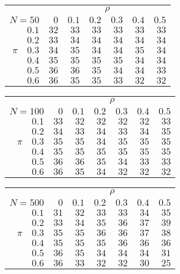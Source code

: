 \begin{tabular}{r|rrrrrr}
\hline\hline
 &\multicolumn{6}{c}{$\rho$} \\ 
 $N = 50$ & $0$ & $0.1$ & $0.2$ & $0.3$ & $0.4$ & $0.5$ \\ 
 \hline$0.1$ & $32$ & $33$ & $33$ & $33$ & $33$ & $33$\\ 
$0.2$ & $33$ & $34$ & $34$ & $34$ & $34$ & $34$\\ 
$\pi\quad$$0.3$ & $34$ & $35$ & $34$ & $34$ & $35$ & $34$\\ 
$0.4$ & $35$ & $35$ & $35$ & $35$ & $34$ & $34$\\ 
$0.5$ & $36$ & $36$ & $35$ & $34$ & $34$ & $33$\\ 
$0.6$ & $36$ & $35$ & $35$ & $33$ & $32$ & $32$\\ 
 \hline 
 \end{tabular}
 
 \vspace{2em} 
 
\begin{tabular}{r|rrrrrr}
\hline\hline
 &\multicolumn{6}{c}{$\rho$} \\ 
 $N = 100$ & $0$ & $0.1$ & $0.2$ & $0.3$ & $0.4$ & $0.5$ \\ 
 \hline$0.1$ & $33$ & $32$ & $32$ & $32$ & $32$ & $33$\\ 
$0.2$ & $34$ & $33$ & $34$ & $33$ & $34$ & $35$\\ 
$\pi\quad$$0.3$ & $35$ & $35$ & $34$ & $35$ & $35$ & $35$\\ 
$0.4$ & $35$ & $35$ & $35$ & $35$ & $35$ & $35$\\ 
$0.5$ & $36$ & $36$ & $35$ & $34$ & $33$ & $33$\\ 
$0.6$ & $36$ & $35$ & $34$ & $32$ & $32$ & $32$\\ 
 \hline 
 \end{tabular}
 
 \vspace{2em} 
 
\begin{tabular}{r|rrrrrr}
\hline\hline
 &\multicolumn{6}{c}{$\rho$} \\ 
 $N = 500$ & $0$ & $0.1$ & $0.2$ & $0.3$ & $0.4$ & $0.5$ \\ 
 \hline$0.1$ & $31$ & $32$ & $33$ & $33$ & $34$ & $35$\\ 
$0.2$ & $33$ & $34$ & $35$ & $36$ & $37$ & $39$\\ 
$\pi\quad$$0.3$ & $35$ & $35$ & $36$ & $36$ & $37$ & $38$\\ 
$0.4$ & $35$ & $35$ & $35$ & $36$ & $36$ & $36$\\ 
$0.5$ & $36$ & $35$ & $34$ & $34$ & $34$ & $31$\\ 
$0.6$ & $36$ & $33$ & $32$ & $32$ & $30$ & $25$\\ 
 \hline 
 \end{tabular}